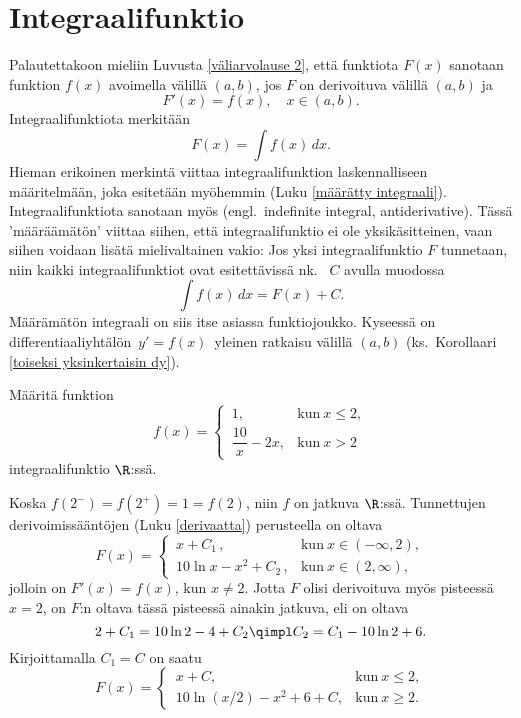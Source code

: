 \section{Integraalifunktio} \label{integraalifunktio}
\alku
{}

Palautettakoon mieliin Luvusta \ref{väliarvolause 2}, että funktiota $F(x)$ sanotaan
funktion $f(x)$  avoimella välillä $(a,b)$, jos $F$ on derivoituva
välillä $(a,b)$ ja
\[
F'(x)=f(x),\quad x\in (a,b).
\]
Integraalifunktiota merkitään
\[
F(x)=\int f(x)\, dx.
\]
Hieman erikoinen merkintä viittaa integraalifunktion laskennalliseen määritelmään, joka 
esitetään myöhemmin (Luku \ref{määrätty integraali}). Integraalifunktiota sanotaan myös
%
 (engl.\ indefinite integral, antiderivative). Tässä
'määräämätön' viittaa siihen, että integraalifunktio ei ole yksikäsitteinen, vaan siihen 
voidaan lisätä mielivaltainen vakio: Jos yksi integraalifunktio $F$ tunnetaan, niin kaikki 
%
integraalifunktiot ovat esitettävissä nk.\  $C$ avulla muodossa
\[
\int f(x)\, dx=F(x)+C.
\]
Määrämätön integraali on siis itse asiassa funktiojoukko. Kyseessä on differentiaaliyhtälön
$\,y'=f(x)\,$ yleinen ratkaisu välillä $(a,b)$ (ks.\ Korollaari 
\ref{toiseksi yksinkertaisin dy}).
\begin{Exa} Määritä funktion
\[
f(x)=\begin{cases} 
     \,1, &\text{kun}\ x \le 2, \\[2mm] 
     \,\dfrac{10}{x}-2x, &\text{kun}\ x>2
     \end{cases}
\]
integraalifunktio $\R$:ssä. \end{Exa}
\ratk Koska $f(2^-)=f(2^+)=1=f(2)$, niin $f$ on jatkuva $\R$:ssä. Tunnettujen 
derivoimissääntöjen (Luku \ref{derivaatta}) perusteella on oltava
\[
F(x) = \begin{cases} 
       \,x+C_1\,, &\text{kun}\ x\in(-\infty,2), \\ 
       \,10\ln x-x^2+C_2\,, &\text{kun}\ x\in(2,\infty),
        \end{cases}
\]
jolloin on $F'(x)=f(x)$, kun $x \neq 2$. Jotta $F$ olisi derivoituva myös pisteessä $x=2$, on
$F$:n oltava tässä pisteessä ainakin jatkuva, eli on oltava
\[
2+C_1 = 10\ln 2-4+C_2 \qimpl C_2 = C_1-10\ln 2+6.
\]
Kirjoittamalla $C_1=C$ on saatu
\[
F(x)=\begin{cases} 
     \,x+C, &\text{kun}\ x \le 2, \\ 
     \,10\ln(x/2)-x^2+6+C, &\text{kun}\ x \ge 2. 
     \end{cases}
\]            
